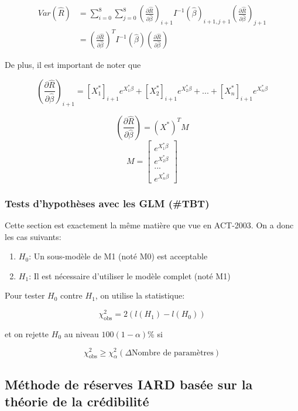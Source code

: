 $$\boxed{\begin{aligned}
Var(\widehat{R}) &= \sum_{i=0}^8 \sum_{j=0}^8 \left(\frac{\partial \widehat{R}}{\partial \widehat{\beta}} \right)_{i+1} I^{-1}(\widehat{\beta})_{i+1,j+1} \left(\frac{\partial \widehat{R}}{\partial \widehat{\beta}} \right)_{j+1} \\
 &= \left(\frac{\partial \widehat{R}}{\partial \widehat{\beta}} \right)^T I^{-1}(\widehat{\beta}) \left(\frac{\partial \widehat{R}}{\partial \widehat{\beta}} \right)
\end{aligned}}$$

De plus, il est important de noter que

$$\left(\frac{\partial \widehat{R}}{\partial \widehat{\beta}} \right)_{i+1} = [X_1^*]_{i+1}e^{X_1^* \beta} + [X_2^*]_{i+1}e^{X_2^* \beta} + ... + [X_n^*]_{i+1}e^{X_n^* \beta}$$

$$\boxed{\left(\frac{\partial \widehat{R}}{\partial \widehat{\beta}} \right) = (X^*)^T M}$$
\[
M = 
\begin{bmatrix}
e^{X_1^* \beta} \\
e^{X_2^* \beta} \\
... \\
e^{X_n^* \beta}
\end{bmatrix}
\]

\subsubsection*{Tests d'hypothèses avec les GLM (\#TBT)}

Cette section est exactement la même matière que vue en ACT-2003. On a donc les cas suivants:

\begin{enumerate}
\item $H_0$: Un sous-modèle de M1 (noté M0) est acceptable
\item $H_1$: Il est nécessaire d'utiliser le modèle complet (noté M1)
\end{enumerate}

Pour tester $H_0$ contre $H_1$, on utilise la statistique:

$$\chi^2_{\text{obs}}=2\left(l(H_1) - l(H_0) \right)$$

et on rejette $H_0$ au niveau $100(1- \alpha)$\% si

$$\chi^2_{\text{obs}} \ge \chi_\alpha^2(\Delta \text{Nombre de paramètres})$$

\subsection*{Méthode de réserves IARD basée sur la théorie de la crédibilité}

